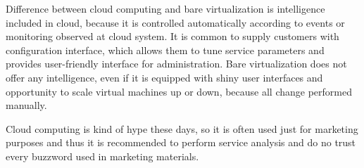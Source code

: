 Difference between cloud computing and bare virtualization is intelligence included in cloud, because it is controlled automatically according to events or monitoring observed at cloud system. It is common to supply customers with configuration interface, which allows them to tune service parameters and provides user-friendly interface for administration.
Bare virtualization does not offer any intelligence, even if it is equipped with shiny user interfaces and opportunity to scale virtual machines up or down, because all change performed manually.

Cloud computing is kind of hype these days, so it is often used just for marketing purposes and thus it is recommended to perform service analysis and do no trust every buzzword used in marketing materials.
